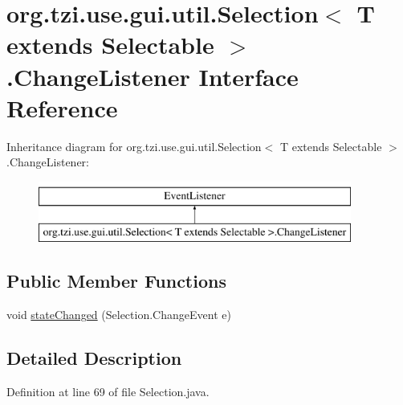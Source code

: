 \hypertarget{interfaceorg_1_1tzi_1_1use_1_1gui_1_1util_1_1_selection_3_01_t_01extends_01_selectable_01_4_1_1_change_listener}{\section{org.\-tzi.\-use.\-gui.\-util.\-Selection$<$ T extends Selectable $>$.Change\-Listener Interface Reference}
\label{interfaceorg_1_1tzi_1_1use_1_1gui_1_1util_1_1_selection_3_01_t_01extends_01_selectable_01_4_1_1_change_listener}
}
Inheritance diagram for org.\-tzi.\-use.\-gui.\-util.\-Selection$<$ T extends Selectable $>$.Change\-Listener\-:\begin{figure}[H]
\begin{center}
\leavevmode
\includegraphics[height=2.000000cm]{interfaceorg_1_1tzi_1_1use_1_1gui_1_1util_1_1_selection_3_01_t_01extends_01_selectable_01_4_1_1_change_listener}
\end{center}
\end{figure}
\subsection*{Public Member Functions}
\begin{DoxyCompactItemize}
\item 
void \hyperlink{interfaceorg_1_1tzi_1_1use_1_1gui_1_1util_1_1_selection_3_01_t_01extends_01_selectable_01_4_1_1_change_listener_a8a813d64e3a30a179bbf6cfca6724030}{state\-Changed} (Selection.\-Change\-Event e)
\end{DoxyCompactItemize}


\subsection{Detailed Description}


Definition at line 69 of file Selection.\-java.



